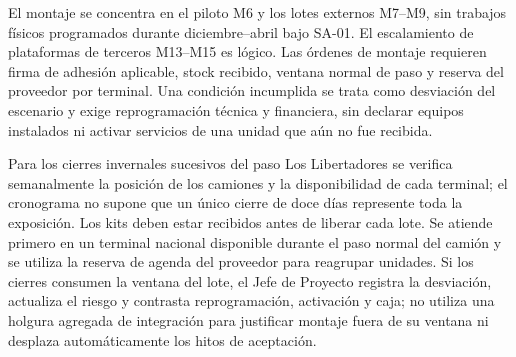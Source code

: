 













El montaje se concentra en el piloto M6 y los lotes externos M7--M9, sin trabajos físicos
programados durante diciembre--abril bajo SA-01. El escalamiento de plataformas de terceros
M13--M15 es lógico. Las órdenes de montaje requieren firma de adhesión aplicable, stock recibido,
ventana normal de paso y reserva del proveedor por terminal. Una condición incumplida se trata
como desviación del escenario y exige reprogramación técnica y financiera, sin declarar equipos
instalados ni activar servicios de una unidad que aún no fue recibida.

Para los cierres invernales sucesivos del paso Los Libertadores se verifica semanalmente
la posición de los camiones y la disponibilidad de cada terminal; el cronograma no supone
que un único cierre de doce días represente toda la exposición. Los kits deben estar recibidos
antes de liberar cada lote. Se atiende primero en un terminal nacional disponible durante el
paso normal del camión y se utiliza la reserva de agenda del proveedor para reagrupar unidades.
Si los cierres consumen la ventana del lote, el Jefe de Proyecto registra la desviación,
actualiza el riesgo y contrasta reprogramación, activación y caja; no utiliza una holgura
agregada de integración para justificar montaje fuera de su ventana ni desplaza automáticamente
los hitos de aceptación.

